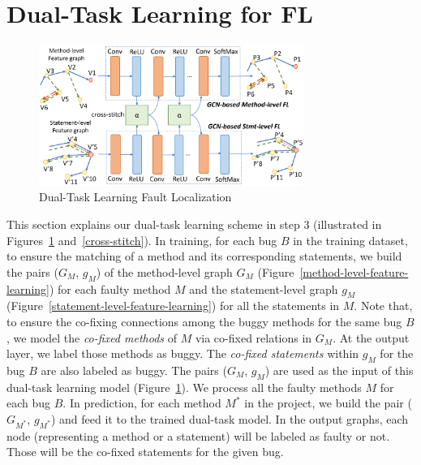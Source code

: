 \section{Dual-Task Learning for FL}
\label{sec:dual-learning}

\begin{figure}[t]
	\centering
	\includegraphics[width=3.4in]{graphs/dual-learning.png}
        \vspace{-18pt}
	\caption{Dual-Task Learning Fault Localization}
	\label{dual-learning}
\end{figure}


This section explains our dual-task learning scheme in step 3
(illustrated in Figures~\ref{dual-learning}
and~\ref{cross-stitch}). In training, for each bug $B$ in the training
dataset, to ensure the matching of a method and its corresponding
statements, we build the pairs ($G_M$, $g_M$) of the method-level
graph $G_M$ (Figure~\ref{method-level-feature-learning}) for each
faulty method $M$ and the statement-level graph $g_M$
(Figure~\ref{statement-level-feature-learning}) for all the statements
in $M$. Note that, to ensure the co-fixing connections among the buggy
methods for the same bug $B$, we model the {\em co-fixed methods} of
$M$ via co-fixed relations in $G_M$. At the output layer, we label
those methods as buggy. The {\em co-fixed statements} within $g_M$ for
the bug $B$ are also labeled as buggy. The pairs ($G_M$, $g_M$) are
used as the input of this dual-task learning model
(Figure~\ref{dual-learning}). We process all the faulty methods $M$ for each
bug $B$. In prediction, for each method $M^{*}$ in the project, we
build the pair ($G_{M^{*}}$, $g_{M^{*}}$) and feed it to the trained
dual-task model. In the output graphs, each node (representing a
method or a statement) will be labeled as faulty or not. Those will be
the co-fixed statements for the given bug.

